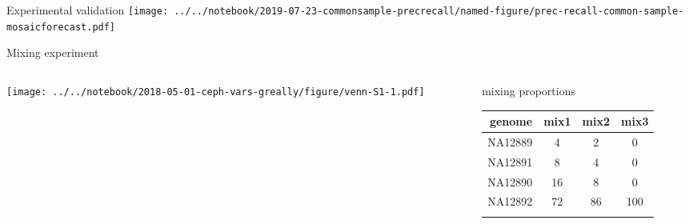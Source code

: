 \documentclass{beamer}
\begin{document}
\begin{frame}{Experimental validation}
\texttt{[image: ../../notebook/2019-07-23-commonsample-precrecall/named-figure/prec-recall-common-sample-mosaicforecast.pdf]}
\end{frame}

\begin{frame}{Mixing experiment}
\begin{columns}[t]
\begin{column}{0.5\textwidth}

\texttt{[image: ../../notebook/2018-05-01-ceph-vars-greally/figure/venn-S1-1.pdf]}
\end{column}

\begin{column}{0.5\textwidth}

{\footnotesize
{\large mixing proportions}

\begin{tabular}{r|ccc}
genome & mix1 & mix2 & mix3 \\
\hline
NA12889 & 4 & 2 & 0 \\
NA12891 & 8 & 4 & 0 \\
NA12890 & 16 & 8 & 0 \\
NA12892 & 72 & 86 & 100 \\
& & & \\
\end{tabular}
}
\end{column}
\end{columns}
\end{frame}
\end{document}
